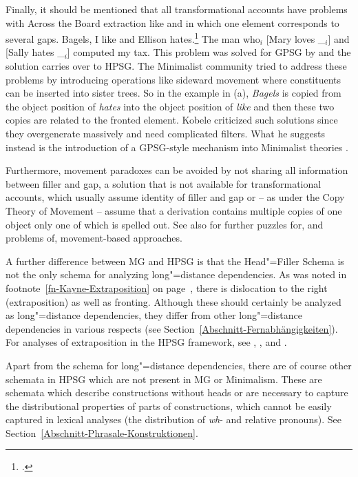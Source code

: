 Finally, it should be mentioned that all transformational accounts have problems with Across the
Board extraction like  and  in which one element corresponds to several gaps.
\eal
\label{ex-atb-minimalism}
\ex\label{ex-bagels-i-like-and-ellison-hates}
Bagels, I like and Ellison hates.\footnote{%
  .
}
\ex The man who$_i$ [Mary loves \_$_i$] and [Sally hates \_$_i$] computed my tax.
\zl
\addlines[2]
This problem was solved for GPSG by \citet{Gazdar81} and the solution carries over to HPSG. The
Minimalist community tried to address these problems by introducing operations like sideward
movement \citep{Nunes2004a-u} where constituents can be inserted into sister trees. So in the
example in (a), \emph{Bagels} is copied from the object position of \emph{hates} into the
object position of \emph{like} and then these two copies are related to the fronted element. Kobele
criticized such solutions since they overgenerate massively and need complicated filters. What he
suggests instead is the introduction of a GPSG-style \slasch mechanism into Minimalist theories \citep{Kobele2008a}.

Furthermore,
movement paradoxes \citep[Chapter~2]{Bresnan2001a} can be avoided by not sharing all information between filler and gap, a solution
that is not available for transformational accounts, which usually assume identity of filler and gap
or -- as under the Copy Theory of Movement -- assume that a derivation contains multiple copies of one
object only one of which is spelled out. See also  for further puzzles for, and
problems of, movement-based approaches.


A further difference between MG and HPSG is that the Head"=Filler Schema is not the only schema for analyzing
long"=distance dependencies. As was noted in footnote~\ref{fn-Kayne-Extraposition} on 
page~\pageref{fn-Kayne-Extraposition}, there is dislocation to the right (extraposition) as well
as fronting. Although these should certainly be analyzed as long"=distance dependencies, they differ from other
long"=distance dependencies in various respects (see Section~\ref{Abschnitt-Fernabhängigkeiten}). For analyses of
extraposition in the HPSG framework, see , , and 
. 

Apart from the schema for long"=distance dependencies, there are of course other schemata in HPSG which are not
present in MG or Minimalism. These are schemata which describe constructions without heads or are necessary to
capture the distributional properties of parts of constructions, which cannot be easily captured in lexical analyses
(\eg the distribution of \emph{wh}- and relative pronouns). See Section~\ref{Abschnitt-Phrasale-Konstruktionen}.  

